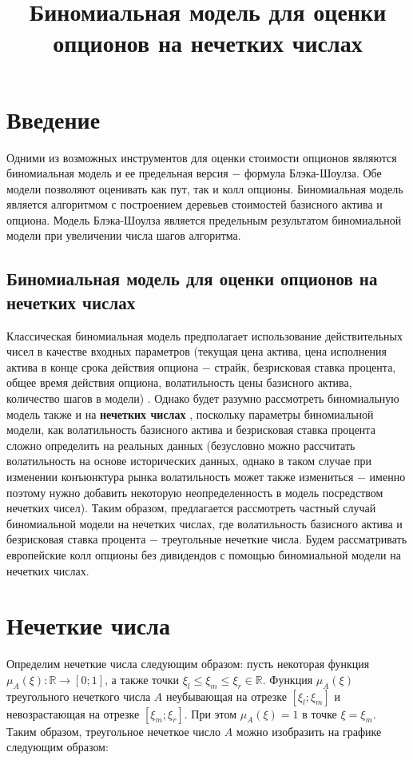 \documentclass[a4paper,12pt]{extarticle} %
\title{Биномиальная модель для оценки опционов на нечетких числах}
\begin{document}
	
	\maketitle{}
	
	\section{Введение}
	Одними из возможных инструментов для оценки стоимости опционов являются биномиальная модель и ее предельная версия $-$ формула Блэка-Шоулза. Обе модели позволяют оценивать как пут, так и колл опционы. Биномиальная модель является алгоритмом с построением деревьев стоимостей базисного актива и опциона. Модель Блэка-Шоулза является предельным результатом биномиальной модели при увеличении числа шагов алгоритма. 
	
		\subsection{Биномиальная модель для оценки опционов на нечетких числах}
		Классическая биномиальная модель предполагает использование действительных чисел в качестве входных параметров (текущая цена актива, цена исполнения актива в конце срока действия опциона $-$ страйк, безрисковая ставка процента, общее время действия опциона, волатильность цены базисного актива, количество шагов в модели) \cite{5}. Однако будет разумно рассмотреть биномиальную модель также и на \textbf{нечетких числах} \cite{3}, поскольку параметры биномиальной модели, как волатильность базисного актива и безрисковая ставка процента сложно определить на реальных данных (безусловно можно рассчитать волатильность на основе исторических данных, однако в таком случае при изменении конъюнктура рынка волатильность может также измениться $-$ именно поэтому нужно добавить некоторую неопределенность в модель посредством нечетких чисел). Таким образом, предлагается рассмотреть частный случай биномиальной модели на нечетких числах, где волатильность базисного актива и безрисковая ставка процента $-$ треугольные нечеткие числа. Будем рассматривать европейские колл опционы без дивидендов с помощью биномиальной модели на нечетких числах. 
	
	\section{Нечеткие числа}
	Определим нечеткие числа следующим образом: 
	пусть некоторая функция $\mu_A (\xi): \mathbb{R} \rightarrow [0;1]$, а также точки $\xi_l \leq \xi_m \leq \xi_r \in \mathbb{R}$. Функция $\mu_A(\xi)$ треугольного нечеткого числа $A$ неубывающая на отрезке $[\xi_l;\xi_m]$ и невозрастающая на отрезке $[\xi_m;\xi_r]$. При этом $\mu_A(\xi)=1$ в точке $\xi=\xi_m$. Таким образом, треугольное нечеткое число $A$ можно изобразить на графике следующим образом:
	
\end{document}
